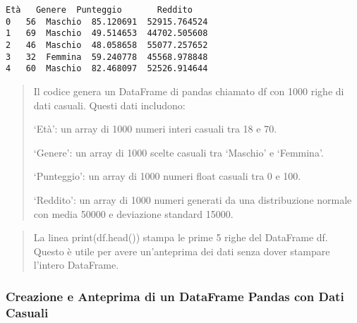 \documentclass[11pt]{article}
\begin{document}
    \begin{Verbatim}[commandchars=\\\{\}]
   Età   Genere  Punteggio       Reddito
0   56  Maschio  85.120691  52915.764524
1   69  Maschio  49.514653  44702.505608
2   46  Maschio  48.058658  55077.257652
3   32  Femmina  59.240778  45568.978848
4   60  Maschio  82.468097  52526.914644
    \end{Verbatim}

    \begin{quote}
Il codice genera un DataFrame di pandas chiamato df con 1000 righe di
dati casuali. Questi dati includono:

`Età': un array di 1000 numeri interi casuali tra 18 e 70.

`Genere': un array di 1000 scelte casuali tra `Maschio' e `Femmina'.

`Punteggio': un array di 1000 numeri float casuali tra 0 e 100.

`Reddito': un array di 1000 numeri generati da una distribuzione normale
con media 50000 e deviazione standard 15000.
\end{quote}

\begin{quote}
La linea print(df.head()) stampa le prime 5 righe del DataFrame df.
Questo è utile per avere un'anteprima dei dati senza dover stampare
l'intero DataFrame.
\end{quote}

    \subsubsection{Creazione e Anteprima di un DataFrame Pandas con Dati
Casuali}\label{creazione-e-anteprima-di-un-dataframe-pandas-con-dati-casuali}
\end{document}
